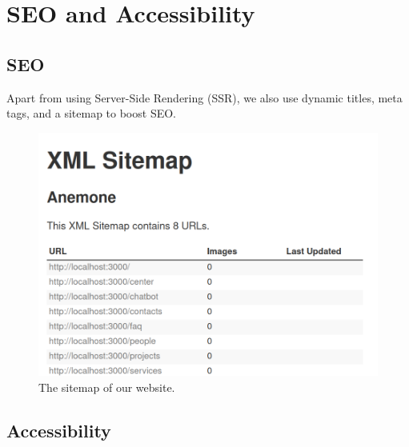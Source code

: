
\section{SEO and Accessibility}
\subsection{SEO}
Apart from using Server-Side Rendering (SSR), we also use dynamic titles, meta tags, and a sitemap to boost SEO.
\begin{figure}[h]
	\centering
	\includegraphics[width=\linewidth]{Resources/sitemap.png}
	\caption{The sitemap of our website.}
	\label{fig:example}
\end{figure}
\subsection{Accessibility}